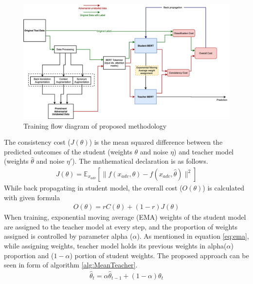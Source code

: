 \documentclass[%
	BCOR=8mm, %
	DIV=12,
	toc=bibliography, %
	toc=listof, %
	oneside, %
	egregdoesnotlikesansseriftitles, %
	]{scrbook}
\begin{document}
 \begin{figure}[h!]
    \centering
    \includegraphics[width=1.1\textwidth]{img/Methodology.png}
    \caption[Training flow diagram of proposed approach]{Training flow diagram of proposed methodology }
    \label{diag:advMTBERT}
\end{figure}
The consistency cost ($J(\theta)$)  is the mean squared difference between the predicted outcomes of the student (weights $\theta$ and noise $\eta$) and teacher model (weights $\hat\theta$ and noise $\eta'$).  The mathematical declaration is as follows. 
\begin{equation}
    \begin{aligned}
        J( \theta )=\mathbb{E}_{x_{adv}}[\|f(x_{adv},\theta)-f(x_{adv},\hat\theta)\|^2]
        \label{eq:ADVconsistencycost}
    \end{aligned}
\end{equation}
While back propagating in student model, the overall cost ($\textit{O}(\theta)$) is calculated with given formula 
 \begin{equation}
     \begin{aligned}
         \textit{O}(\theta)= r C(\theta)+(1-r)J(\theta)
         \label{eq:overallcost}
         \end{aligned}
   \end{equation}
   When training, exponential moving average (EMA) weights of the student model are assigned to the teacher model at every step, and the proportion of weights assigned is controlled by parameter alpha ($\alpha$). As mentioned in equation \ref{eq:ema}, while assigning weights, teacher model holds its previous weights in alpha($\alpha$) proportion and ($1-\alpha$) portion of student weights. The proposed approach can be seen in form of algorithm \ref{alg:MeanTeacher}.
 \begin{equation}
     \begin{aligned}
         \hat\theta_t= \alpha\hat\theta_{t-1}+(1-\alpha)\theta_t
         \label{eq:ema}
         \end{aligned}
  \end{equation}
\end{document}

